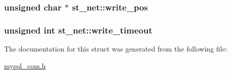 \subsubsection[{write\+\_\+pos}]{\setlength{\rightskip}{0pt plus 5cm}unsigned char $\ast$ st\+\_\+net\+::write\+\_\+pos}\label{structst__net_af160b75bc1ab06bd72a88ba7417f826e}
\hypertarget{structst__net_a178724b62ac9b041f5e21b1b9897b694}{}
\subsubsection[{write\+\_\+timeout}]{\setlength{\rightskip}{0pt plus 5cm}unsigned int st\+\_\+net\+::write\+\_\+timeout}\label{structst__net_a178724b62ac9b041f5e21b1b9897b694}


The documentation for this struct was generated from the following file\+:\begin{DoxyCompactItemize}
\item 
\hyperlink{mysql__com_8h}{mysql\+\_\+com.\+h}\end{DoxyCompactItemize}
